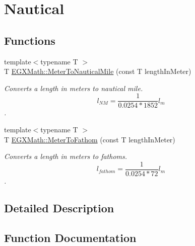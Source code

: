 \hypertarget{group___e_g_x_math-_conversions-_length_conversions-_s_i-_meter-_nautical}{}\section{Nautical}
\label{group___e_g_x_math-_conversions-_length_conversions-_s_i-_meter-_nautical}
\subsection*{Functions}
\begin{DoxyCompactItemize}
\item 
{\footnotesize template$<$typename T $>$ }\\T \mbox{\hyperlink{group___e_g_x_math-_conversions-_length_conversions-_s_i-_meter-_nautical_ga501f0dd53cb3c21d377eac2a18fabdf8}{E\+G\+X\+Math\+::\+Meter\+To\+Nautical\+Mile}} (const T length\+In\+Meter)
\begin{DoxyCompactList}\small\item\em Converts a length in meters to nautical mile. \[ l_{NM}= \frac{1}{0.0254 * 1852} l_{m} \]. \end{DoxyCompactList}\item 
{\footnotesize template$<$typename T $>$ }\\T \mbox{\hyperlink{group___e_g_x_math-_conversions-_length_conversions-_s_i-_meter-_nautical_gaa66945d01b3da25cb9d52cd15f4aa38e}{E\+G\+X\+Math\+::\+Meter\+To\+Fathom}} (const T length\+In\+Meter)
\begin{DoxyCompactList}\small\item\em Converts a length in meters to fathoms. \[ l_{fathom}= \frac{1}{0.0254 * 72} l_{m} \]. \end{DoxyCompactList}\end{DoxyCompactItemize}


\subsection{Detailed Description}


\subsection{Function Documentation}
\mbox{\label{group___e_g_x_math-_conversions-_length_conversions-_s_i-_meter-_nautical_gaa66945d01b3da25cb9d52cd15f4aa38e}} 

